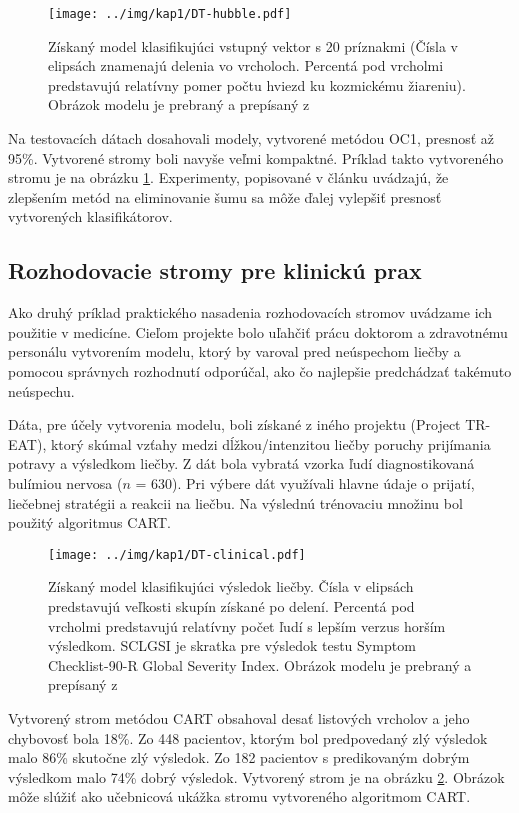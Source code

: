 \begin{figure}[h]
\centering
\centerline{\mbox{\texttt{[image: ../img/kap1/DT-hubble.pdf]}}}
\caption{Získaný model klasifikujúci vstupný vektor s 20 príznakmi (Čísla v elipsách znamenajú delenia vo vrcholoch. Percentá pod vrcholmi predstavujú relatívny pomer počtu hviezd ku kozmickému žiareniu). Obrázok modelu je prebraný a prepísaný z \cite[str. 284]{online-astronomy}}\label{fig:HubbleTree}
\end{figure}

Na testovacích dátach dosahovali modely, vytvorené metódou OC1, presnosť až 95\%. Vytvorené stromy boli navyše veľmi kompaktné. Príklad takto vytvoreného stromu je na obrázku \ref{fig:HubbleTree}. Experimenty, popisované v článku uvádzajú, že zlepšením metód na eliminovanie šumu sa môže ďalej vylepšiť presnosť vytvorených klasifikátorov.

\subsection{Rozhodovacie stromy pre klinickú prax}\label{kap1:2.8:2.8.3:Clinical}
Ako druhý príklad praktického nasadenia rozhodovacích stromov uvádzame ich použitie v medicíne. Cieľom projekte bolo uľahčiť prácu doktorom a zdravotnému personálu vytvorením modelu, ktorý by varoval pred neúspechom liečby a pomocou správnych rozhodnutí odporúčal, ako čo najlepšie predchádzať takémuto neúspechu. 

Dáta, pre účely vytvorenia modelu, boli získané z iného projektu (Project TR-EAT), ktorý skúmal vzťahy medzi dĺžkou/intenzitou liečby poruchy prijímania potravy a výsledkom liečby. Z dát bola vybratá vzorka ľudí diagnostikovaná bulímiou nervosa ($n$ = 630). Pri výbere dát využívali hlavne údaje o prijatí, liečebnej stratégii a reakcii na liečbu. Na výslednú trénovaciu množinu bol použitý algoritmus CART.

\begin{figure}[h]
\centering
\centerline{\mbox{\texttt{[image: ../img/kap1/DT-clinical.pdf]}}}
\caption{Získaný model klasifikujúci výsledok liečby. Čísla v elipsách predstavujú veľkosti skupín získané po delení. Percentá pod vrcholmi predstavujú relatívny počet ľudí s lepším verzus horším výsledkom. SCLGSI je skratka pre výsledok testu Symptom Checklist-90-R Global Severity Index. Obrázok modelu je prebraný a prepísaný z \cite[s. 454]{online-psychoterapy}}\label{fig:ClinicalTree}
\end{figure}

Vytvorený strom metódou CART obsahoval desať listových vrcholov a jeho chybovosť bola 18\%. Zo 448 pacientov, ktorým bol predpovedaný zlý výsledok malo 86\% skutočne zlý výsledok. Zo 182 pacientov s predikovaným dobrým výsledkom malo 74\% dobrý výsledok. Vytvorený strom je na obrázku \ref{fig:ClinicalTree}. Obrázok môže slúžiť ako učebnicová ukážka stromu vytvoreného algoritmom CART.